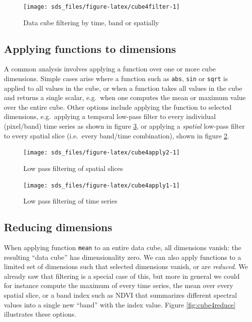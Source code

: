 \documentclass[]{book}
\begin{document}
\begin{figure}

{\centering \texttt{[image: sds\_files/figure-latex/cube4filter-1]} 

}

\caption{Data cube filtering by time, band or spatially}\label{fig:cube4filter}
\end{figure}

\hypertarget{applydimension}{%
\subsection{Applying functions to dimensions}\label{applydimension}}

A common analysis involves applying a function over one or more
cube dimensions. Simple cases arise where a function such as \texttt{abs},
\texttt{sin} or \texttt{sqrt} is applied to all values in the cube, or when a function
takes all values in the cube and returns a single scalar, e.g.~when
one computes the mean or maximum value over the entire cube. Other
options include applying the function to selected dimensions,
e.g.~applying a temporal low-pass filter to every individual
(pixel/band) time series as shown in figure \ref{fig:cube4apply1},
or applying a \emph{spatial} low-pass filter to every spatial
slice (i.e.~every band/time combination), shown in figure
\ref{fig:cube4apply2}.

\begin{figure}

{\centering \texttt{[image: sds\_files/figure-latex/cube4apply2-1]} 

}

\caption{Low pass filtering of spatial slices}\label{fig:cube4apply2}
\end{figure}

\begin{figure}

{\centering \texttt{[image: sds\_files/figure-latex/cube4apply1-1]} 

}

\caption{Low pass filtering of time series}\label{fig:cube4apply1}
\end{figure}

\hypertarget{reducedimension}{%
\subsection{Reducing dimensions}\label{reducedimension}}

When applying function \texttt{mean} to an entire data cube, all dimensions
vanish: the resulting ``data cube'' has dimensionality zero. We
can also apply functions to a limited set of dimensions such that
selected dimensions vanish, or are \emph{reduced}. We already saw that
filtering is a special case of this, but more in general we could
for instance compute the maximum of every time series, the mean over
every spatial slice, or a band index such as NDVI that summarizes
different spectral values into a single new ``band'' with the index
value. Figure \ref{fig:cube4reduce} illustrates these options.
\end{document}
